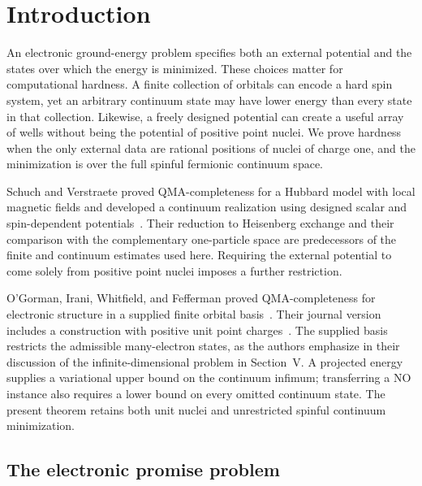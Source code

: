 \section{Introduction}\label{sec:introduction}

An electronic ground-energy problem specifies both an external potential
and the states over which the energy is minimized. These choices matter
for computational hardness. A finite collection of orbitals can encode a
hard spin system, yet an arbitrary continuum state may have lower energy
than every state in that collection. Likewise, a freely designed
potential can create a useful array of wells without being the potential
of positive point nuclei. We prove hardness when the only external data
are rational positions of nuclei of charge one, and the minimization is
over the full spinful fermionic continuum space.

Schuch and Verstraete proved QMA-completeness for a Hubbard model with
local magnetic fields and developed a continuum realization using
designed scalar and spin-dependent
potentials~\cite{SchuchVerstraete2009}. Their reduction to Heisenberg
exchange and their comparison with the complementary one-particle space
are predecessors of the finite and continuum estimates used here.
Requiring the external potential to come solely from positive point
nuclei imposes a further restriction.

O'Gorman, Irani, Whitfield, and Fefferman proved QMA-completeness for
electronic structure in a supplied finite orbital
basis~\cite[Theorem 1]{OGorman2022}. Their journal version includes a
construction with positive unit point
charges~\cite[Appendix D, Corollary 1]{OGorman2022}. The supplied basis
restricts the admissible many-electron states, as the authors emphasize
in their discussion of the infinite-dimensional problem in Section~V.
A projected energy supplies a variational upper bound on the continuum
infimum; transferring a NO instance also requires a lower bound on every
omitted continuum state. The present theorem retains both unit nuclei
and unrestricted spinful continuum minimization.

\subsection{The electronic promise problem}

